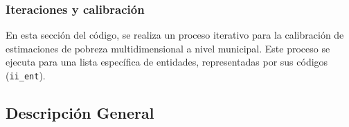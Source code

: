 \documentclass[
  12pt,
]{book}
\begin{document}
\hypertarget{iteraciones-y-calibraciuxf3n}{%
\subsubsection*{Iteraciones y calibración}\label{iteraciones-y-calibraciuxf3n}}

En esta sección del código, se realiza un proceso iterativo para la calibración de estimaciones de pobreza multidimensional a nivel municipal. Este proceso se ejecuta para una lista específica de entidades, representadas por sus códigos (\texttt{ii\_ent}).

\hypertarget{descripciuxf3n-general}{%
\subsection{Descripción General}\label{descripciuxf3n-general}}
\end{document}

